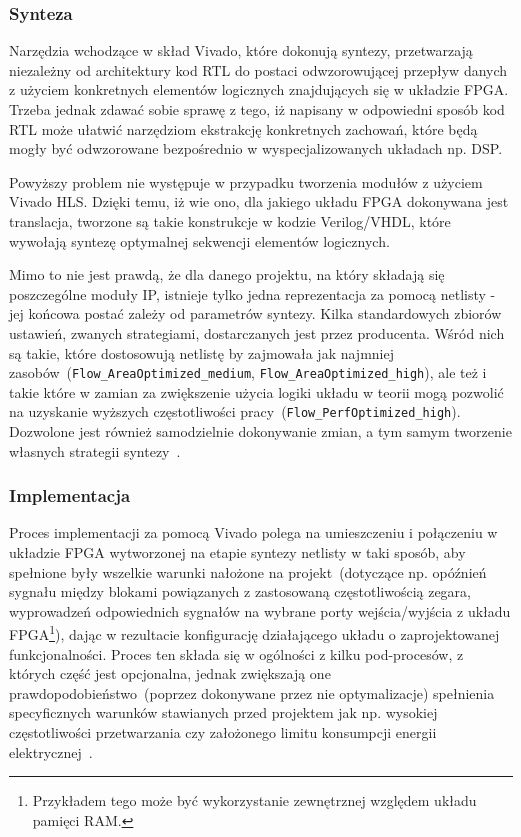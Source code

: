 \subsubsection{Synteza}
Narzędzia wchodzące w skład Vivado, które dokonują syntezy, przetwarzają niezależny od architektury kod RTL do postaci odwzorowującej przepływ danych z użyciem konkretnych elementów logicznych znajdujących się w układzie FPGA. Trzeba jednak zdawać sobie sprawę z tego, iż napisany w odpowiedni sposób kod RTL może ułatwić narzędziom ekstrakcję konkretnych zachowań, które będą mogły być odwzorowane bezpośrednio w wyspecjalizowanych układach np. DSP. 

Powyższy problem nie występuje w przypadku tworzenia modułów z użyciem Vivado HLS. Dzięki temu, iż wie ono, dla jakiego układu FPGA dokonywana jest translacja, tworzone są takie konstrukcje w kodzie Verilog/VHDL, które wywołają syntezę optymalnej sekwencji elementów logicznych. 

Mimo to nie jest prawdą, że dla danego projektu, na który składają się poszczególne moduły IP, istnieje tylko jedna reprezentacja za pomocą netlisty - jej końcowa postać zależy od parametrów syntezy. Kilka standardowych zbiorów ustawień, zwanych strategiami, dostarczanych jest przez producenta. Wśród nich są takie, które dostosowują netlistę by zajmowała jak najmniej zasobów~(\texttt{Flow\_AreaOptimized\_medium}, \texttt{Flow\_AreaOptimized\_high}), ale też i takie które w zamian za zwiększenie użycia logiki układu w teorii mogą pozwolić na uzyskanie wyższych częstotliwości pracy~(\texttt{Flow\_PerfOptimized\_high}). Dozwolone jest również samodzielnie dokonywanie zmian, a tym samym tworzenie własnych strategii syntezy~\cite{UG901}. 

\subsubsection{Implementacja}
Proces implementacji za pomocą Vivado polega na umieszczeniu i połączeniu w układzie FPGA wytworzonej na etapie syntezy netlisty w taki sposób, aby spełnione były wszelkie warunki nałożone na projekt~(dotyczące np. opóźnień sygnału między blokami powiązanych z zastosowaną częstotliwością zegara, wyprowadzeń odpowiednich sygnałów na wybrane porty wejścia/wyjścia z układu FPGA\footnote{Przykładem tego może być wykorzystanie zewnętrznej względem układu pamięci RAM.}), dając w rezultacie konfigurację działającego układu o zaprojektowanej funkcjonalności. Proces ten składa się w ogólności z kilku pod-procesów, z których część jest opcjonalna, jednak zwiększają one prawdopodobieństwo~(poprzez dokonywane przez nie optymalizacje) spełnienia specyficznych warunków stawianych przed projektem jak np. wysokiej częstotliwości przetwarzania czy założonego limitu konsumpcji energii elektrycznej~\cite{UG904}. 

